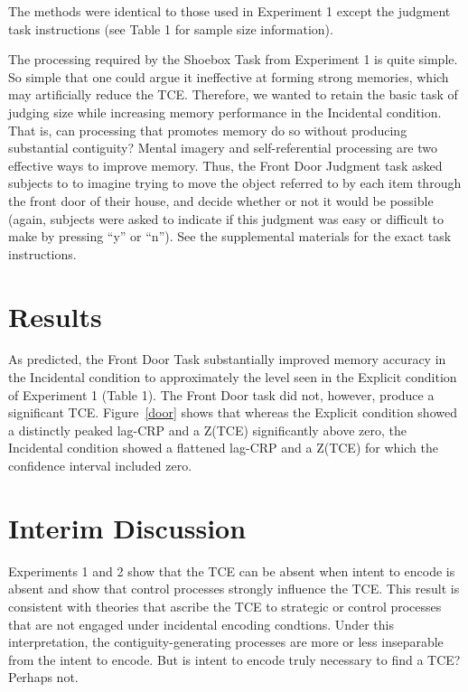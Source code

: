 \documentclass[jou,natbib]{apa6} %
\begin{document}
The methods were identical to those used in Experiment 1 except the judgment task instructions (see Table 1 for sample size information).

The processing required by the Shoebox Task from Experiment 1 is quite simple. So simple that one could argue it ineffective at forming strong memories, which may artificially reduce the TCE. Therefore, we wanted to retain the basic task of judging size while increasing memory performance in the Incidental condition. That is, can processing that promotes memory do so without producing substantial contiguity? Mental imagery and self-referential processing are two effective ways to improve memory. Thus, the Front Door Judgment task asked subjects to to imagine trying to move the object referred to by each item through the front door of their house, and decide whether or not it would be possible (again, subjects were asked to indicate if this judgment was easy or difficult to make by pressing ``y'' or ``n'').
See the supplemental materials for the exact task instructions.

\section{Results}
As predicted, the Front Door Task substantially improved memory accuracy in the Incidental condition to approximately the level seen in the Explicit condition of Experiment 1 (Table 1). The Front Door task did not, however, produce a significant TCE. Figure~\ref{door} shows that whereas the Explicit condition showed a distinctly peaked lag-CRP and a Z(TCE) significantly above zero, the Incidental condition showed a flattened lag-CRP and a Z(TCE) for which the confidence interval included zero.

\begin{figure*}%
\caption{The temporal contiguity effect (TCE) with the Front Door size judgment task under explicit versus incidental encoding. \paneltext}
\label{door}
\end{figure*}

\section{Interim Discussion}


Experiments 1 and 2 show that the TCE can be absent when intent to encode is absent and show that control processes strongly influence the TCE. This result is consistent with theories that ascribe the TCE to strategic or control processes that are not engaged under incidental encoding condtions. Under this interpretation, the contiguity-generating processes are more or less inseparable from the intent to encode. But is intent to encode truly necessary to find a TCE? Perhaps not.
\end{document}
